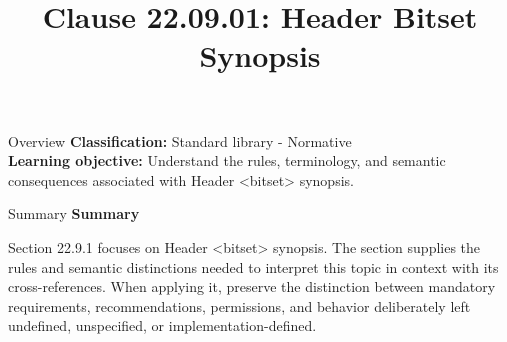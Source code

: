 \documentclass[10pt,letterpaper]{article}
\title{Clause 22.09.01: Header Bitset Synopsis}
\author{}
\date{}
\begin{document}
\maketitle
\begin{CornellOverviewBox}{Overview}
\textbf{Classification:} Standard library - Normative\\[2pt]
\textbf{Learning objective:} Understand the rules, terminology, and semantic consequences associated with Header <bitset> synopsis.
\end{CornellOverviewBox}\begin{CornellSummaryBox}{Summary}
{\sffamily\bfseries\color{Accent} Summary}\par\vspace{3pt}Section 22.9.1 focuses on Header <bitset> synopsis. The section supplies the rules and semantic distinctions needed to interpret this topic in context with its cross-references. When applying it, preserve the distinction between mandatory requirements, recommendations, permissions, and behavior deliberately left undefined, unspecified, or implementation-defined.
\end{CornellSummaryBox}
\end{document}
